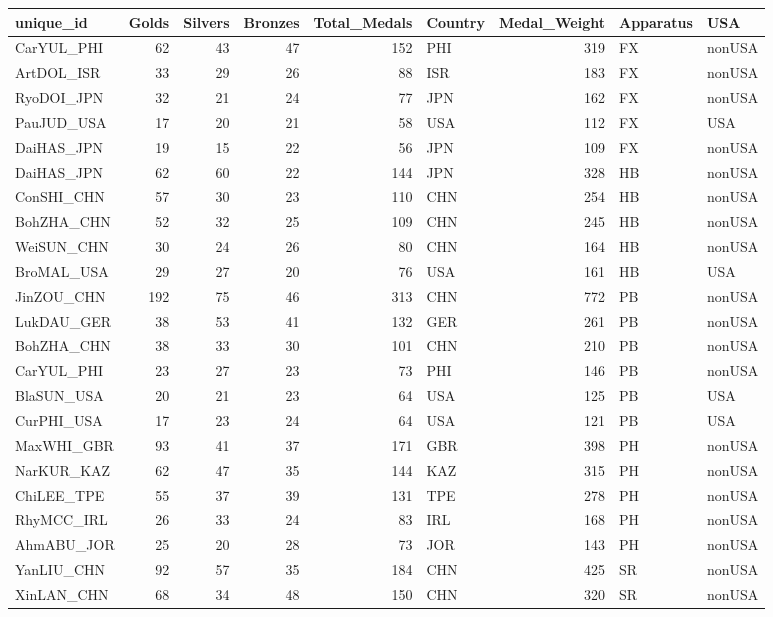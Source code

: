 \documentclass[
  letterpaper,
  DIV=11,
  numbers=noendperiod]{scrartcl}
\begin{document}
\begin{tabular}{l|r|r|r|r|l|r|l|l}
\hline
unique\_id & Golds & Silvers & Bronzes & Total\_Medals & Country & Medal\_Weight & Apparatus & USA\\
\hline
CarYUL\_PHI & 62 & 43 & 47 & 152 & PHI & 319 & FX & nonUSA\\
\hline
ArtDOL\_ISR & 33 & 29 & 26 & 88 & ISR & 183 & FX & nonUSA\\
\hline
RyoDOI\_JPN & 32 & 21 & 24 & 77 & JPN & 162 & FX & nonUSA\\
\hline
PauJUD\_USA & 17 & 20 & 21 & 58 & USA & 112 & FX & USA\\
\hline
DaiHAS\_JPN & 19 & 15 & 22 & 56 & JPN & 109 & FX & nonUSA\\
\hline
DaiHAS\_JPN & 62 & 60 & 22 & 144 & JPN & 328 & HB & nonUSA\\
\hline
ConSHI\_CHN & 57 & 30 & 23 & 110 & CHN & 254 & HB & nonUSA\\
\hline
BohZHA\_CHN & 52 & 32 & 25 & 109 & CHN & 245 & HB & nonUSA\\
\hline
WeiSUN\_CHN & 30 & 24 & 26 & 80 & CHN & 164 & HB & nonUSA\\
\hline
BroMAL\_USA & 29 & 27 & 20 & 76 & USA & 161 & HB & USA\\
\hline
JinZOU\_CHN & 192 & 75 & 46 & 313 & CHN & 772 & PB & nonUSA\\
\hline
LukDAU\_GER & 38 & 53 & 41 & 132 & GER & 261 & PB & nonUSA\\
\hline
BohZHA\_CHN & 38 & 33 & 30 & 101 & CHN & 210 & PB & nonUSA\\
\hline
CarYUL\_PHI & 23 & 27 & 23 & 73 & PHI & 146 & PB & nonUSA\\
\hline
BlaSUN\_USA & 20 & 21 & 23 & 64 & USA & 125 & PB & USA\\
\hline
CurPHI\_USA & 17 & 23 & 24 & 64 & USA & 121 & PB & USA\\
\hline
MaxWHI\_GBR & 93 & 41 & 37 & 171 & GBR & 398 & PH & nonUSA\\
\hline
NarKUR\_KAZ & 62 & 47 & 35 & 144 & KAZ & 315 & PH & nonUSA\\
\hline
ChiLEE\_TPE & 55 & 37 & 39 & 131 & TPE & 278 & PH & nonUSA\\
\hline
RhyMCC\_IRL & 26 & 33 & 24 & 83 & IRL & 168 & PH & nonUSA\\
\hline
AhmABU\_JOR & 25 & 20 & 28 & 73 & JOR & 143 & PH & nonUSA\\
\hline
YanLIU\_CHN & 92 & 57 & 35 & 184 & CHN & 425 & SR & nonUSA\\
\hline
XinLAN\_CHN & 68 & 34 & 48 & 150 & CHN & 320 & SR & nonUSA\\

\end{tabular}
\end{document}
